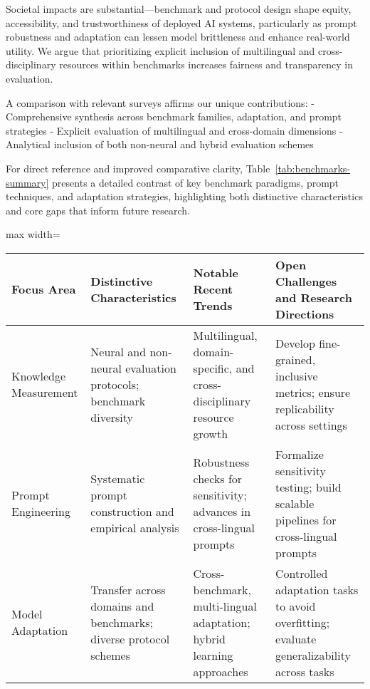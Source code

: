 \documentclass[sigconf]{acmart}
\begin{document}
Societal impacts are substantial—benchmark and protocol design shape equity, accessibility, and trustworthiness of deployed AI systems, particularly as prompt robustness and adaptation can lessen model brittleness and enhance real-world utility. We argue that prioritizing explicit inclusion of multilingual and cross-disciplinary resources within benchmarks increases fairness and transparency in evaluation.

A comparison with relevant surveys affirms our unique contributions: 
- Comprehensive synthesis across benchmark families, adaptation, and prompt strategies 
- Explicit evaluation of multilingual and cross-domain dimensions 
- Analytical inclusion of both non-neural and hybrid evaluation schemes

For direct reference and improved comparative clarity, Table~\ref{tab:benchmarks-summary} presents a detailed contrast of key benchmark paradigms, prompt techniques, and adaptation strategies, highlighting both distinctive characteristics and core gaps that inform future research.

\begin{table*}[htbp]
\centering
\caption{Summary of Key Benchmarks, Prompt Techniques, and Adaptation Strategies}
\label{tab:benchmarks-summary}
\begin{adjustbox}{max width=\textwidth}
\begin{tabular}{@{}llll@{}}
\toprule
Focus Area         & Distinctive Characteristics               & Notable Recent Trends                          & Open Challenges and Research Directions\\
\midrule
Knowledge Measurement & Neural and non-neural evaluation protocols; benchmark diversity & Multilingual, domain-specific, and cross-disciplinary resource growth & Develop fine-grained, inclusive metrics; ensure replicability across settings \\
Prompt Engineering     & Systematic prompt construction and empirical analysis    & Robustness checks for sensitivity; advances in cross-lingual prompts     & Formalize sensitivity testing; build scalable pipelines for cross-lingual prompts\\
Model Adaptation       & Transfer across domains and benchmarks; diverse protocol schemes   & Cross-benchmark, multi-lingual adaptation; hybrid learning approaches & Controlled adaptation tasks to avoid overfitting; evaluate generalizability across tasks\\
\bottomrule
\end{tabular}
\end{adjustbox}
\end{table*}
\end{document}
